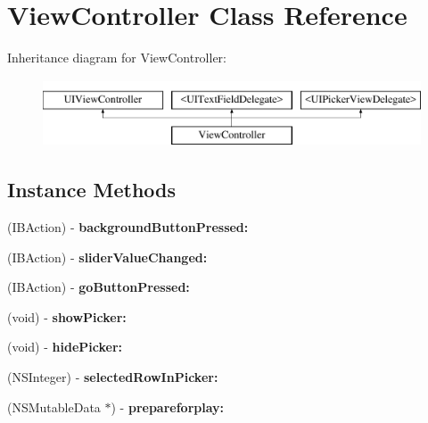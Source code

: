 \hypertarget{interface_view_controller}{}\section{View\+Controller Class Reference}
\label{interface_view_controller}
Inheritance diagram for View\+Controller\+:\begin{figure}[H]
\begin{center}
\leavevmode
\includegraphics[height=2.000000cm]{interface_view_controller}
\end{center}
\end{figure}
\subsection*{Instance Methods}
\begin{DoxyCompactItemize}
\item 
\mbox{\label{interface_view_controller_af998e4b7ee7412df260fe15a1e11593d}} 
(I\+B\+Action) -\/ {\bfseries background\+Button\+Pressed\+:}
\item 
\mbox{\label{interface_view_controller_a57c529b23f754b32680910bd113a58d2}} 
(I\+B\+Action) -\/ {\bfseries slider\+Value\+Changed\+:}
\item 
\mbox{\label{interface_view_controller_a04e6382d0883a311916ddf1f96598be5}} 
(I\+B\+Action) -\/ {\bfseries go\+Button\+Pressed\+:}
\item 
\mbox{\label{interface_view_controller_adfd81c87a0224757b4490cffb7d949af}} 
(void) -\/ {\bfseries show\+Picker\+:}
\item 
\mbox{\label{interface_view_controller_a5a5e8318b7fbb459130b7a9ca2d8566c}} 
(void) -\/ {\bfseries hide\+Picker\+:}
\item 
\mbox{\label{interface_view_controller_ae930222418ea719390c084f981e010e8}} 
(N\+S\+Integer) -\/ {\bfseries selected\+Row\+In\+Picker\+:}
\item 
\mbox{\label{interface_view_controller_a05fc90a938185afb08bb8f6b2eb47c20}} 
(N\+S\+Mutable\+Data $\ast$) -\/ {\bfseries prepareforplay\+:}
\end{DoxyCompactItemize}
